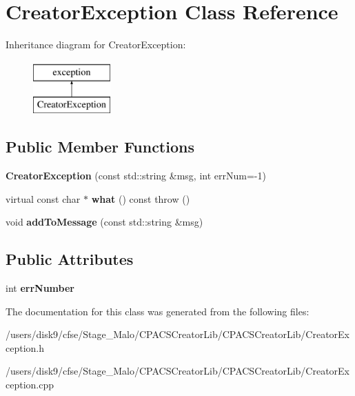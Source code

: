 \hypertarget{classCreatorException}{\section{Creator\-Exception Class Reference}
\label{classCreatorException}
}
Inheritance diagram for Creator\-Exception\-:\begin{figure}[H]
\begin{center}
\leavevmode
\includegraphics[height=2.000000cm]{classCreatorException}
\end{center}
\end{figure}
\subsection*{Public Member Functions}
\begin{DoxyCompactItemize}
\item 
\hypertarget{classCreatorException_ae77e43c3b0906d16f1f0fb02fc13ec1b}{{\bfseries Creator\-Exception} (const std\-::string \&msg, int err\-Num=-\/1)}\label{classCreatorException_ae77e43c3b0906d16f1f0fb02fc13ec1b}

\item 
\hypertarget{classCreatorException_a12dddef6d880bbd5d171debdea0bae17}{virtual const char $\ast$ {\bfseries what} () const   throw ()}\label{classCreatorException_a12dddef6d880bbd5d171debdea0bae17}

\item 
\hypertarget{classCreatorException_a153befd4e3cd6016fd3c5719e6deac28}{void {\bfseries add\-To\-Message} (const std\-::string \&msg)}\label{classCreatorException_a153befd4e3cd6016fd3c5719e6deac28}

\end{DoxyCompactItemize}
\subsection*{Public Attributes}
\begin{DoxyCompactItemize}
\item 
\hypertarget{classCreatorException_a27b5d0e83422ad885ea701f38a23644e}{int {\bfseries err\-Number}}\label{classCreatorException_a27b5d0e83422ad885ea701f38a23644e}

\end{DoxyCompactItemize}


The documentation for this class was generated from the following files\-:\begin{DoxyCompactItemize}
\item 
/users/disk9/cfse/\-Stage\-\_\-\-Malo/\-C\-P\-A\-C\-S\-Creator\-Lib/\-C\-P\-A\-C\-S\-Creator\-Lib/Creator\-Exception.\-h\item 
/users/disk9/cfse/\-Stage\-\_\-\-Malo/\-C\-P\-A\-C\-S\-Creator\-Lib/\-C\-P\-A\-C\-S\-Creator\-Lib/Creator\-Exception.\-cpp\end{DoxyCompactItemize}
